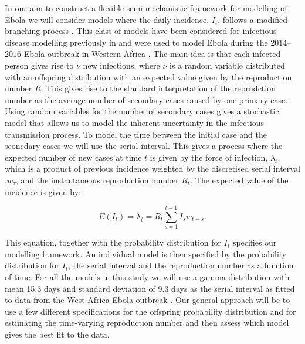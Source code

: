 \documentclass[12pt]{article}
\begin{document}
In our aim to construct a flexible semi-mechanistic framework for modelling of Ebola we will consider models where the daily incidence, $I_t$, follows a modified branching process \cite{jacobBranchingProcessesTheir2010}. This class of models have been considered for infectious disease modelling previously in \cite{coriNewFrameworkSoftware2013,lloyd-smithSuperspreadingEffectIndividual2005,nouvelletSimpleApproachMeasure2018} and were used to model Ebola during the 2014--2016 Ebola outbreak in Western Africa \cite{whoebolaresponseteamEbolaVirusDisease2014, internationalebolaresponseteamExposurePatternsDriving2016}. The main idea is that each infected person gives rise to $\nu$ new infections, where $\nu$ is a random variable distributed with an offspring distribution with an expected value given by the reproduction number $R$. This gives rise to the standard interpretation of the reprudction number as the average number of secondary cases caused by one primary case. Using random variables for the number of secondary cases gives a stochastic model that allows us to model the inherent uncertainty in the infectious transmission process. To model the time between the initial case and the seoncdary cases we will use the serial interval. This gives a process where the expected number of new cases at time $t$ is given by the force of infection, $\lambda_t$, which is a product of previous incidence weighted by the discretised serial interval ,$w_\tau$, and the instantaneous reproduction number $R_t$. The expected value of the incidence is given by:

\begin{equation}
  E(I_t) = \lambda_t =  R_t \sum^{t-1}_{s=1} I_s w_{t-s}.
  \label{eq:mean_It}
\end{equation}

This equation, together with the probability distribution for $I_t$ specifies our modelling framework. An individual model is then specified by the probability distribution for $I_t$, the serial interval and the reproduction number as a function of time. For all the models in this study we will use a gamma-distribution with mean 15.3 days and standard deviation of 9.3 days as the serial interval as fitted to data from the West-Africa Ebola outbreak \cite{whoebolaresponseteamEbolaVirusDisease2014}. Our general approach will be to use a few different specifications for the offspring probability distribution and for estimating the time-varying reproduction number and then assess which model gives the best fit to the data.
\end{document}
